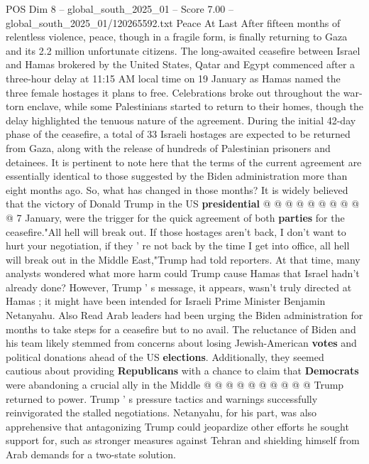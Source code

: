 \begin{textsample}{POS Dim 8 – global\_south\_2025\_01 – Score 7.00 – global\_south\_2025\_01/120265592.txt}  \label{ex:f8_pos_321}
Peace At Last After fifteen months of relentless violence, peace, though in a fragile form, is finally returning to Gaza and its 2.2 million unfortunate citizens.
The long-awaited ceasefire between Israel and Hamas brokered by the United States, Qatar and Egypt commenced after a three-hour delay at 11:15 AM local time on 19 January as Hamas named the three female hostages it plans to free.
Celebrations broke out throughout the war-torn enclave, while some Palestinians started to return to their homes, though the delay highlighted the tenuous nature of the agreement.
During the initial 42-day phase of the ceasefire, a total of 33 Israeli hostages are expected to be returned from Gaza, along with the release of hundreds of Palestinian prisoners and detainees.
It is pertinent to note here that the terms of the current agreement are essentially identical to those suggested by the Biden administration more than eight months ago.
So, what has changed in those months?
It is widely believed that the victory of Donald Trump in the US \textbf{presidential} @ @ @ @ @ @ @ @ @ @ 7 January, were the trigger for the quick agreement of both \textbf{parties} for the ceasefire."All hell will break out.
If those hostages aren't back, I don't want to hurt your negotiation, if they ' re not back by the time I get into office, all hell will break out in the Middle East,"Trump had told reporters.
At that time, many analysts wondered what more harm could Trump cause Hamas that Israel hadn't already done?
However, Trump ' s message, it appears, wasn't truly directed at Hamas ; it might have been intended for Israeli Prime Minister Benjamin Netanyahu.
Also Read Arab leaders had been urging the Biden administration for months to take steps for a ceasefire but to no avail.
The reluctance of Biden and his team likely stemmed from concerns about losing Jewish-American \textbf{votes} and political donations ahead of the US \textbf{elections}.
Additionally, they seemed cautious about providing \textbf{Republicans} with a chance to claim that \textbf{Democrats} were abandoning a crucial ally in the Middle @ @ @ @ @ @ @ @ @ @ Trump returned to power.
Trump ' s pressure tactics and warnings successfully reinvigorated the stalled negotiations.
Netanyahu, for his part, was also apprehensive that antagonizing Trump could jeopardize other efforts he sought support for, such as stronger measures against Tehran and shielding himself from Arab demands for a two-state solution.

\end{textsample}
